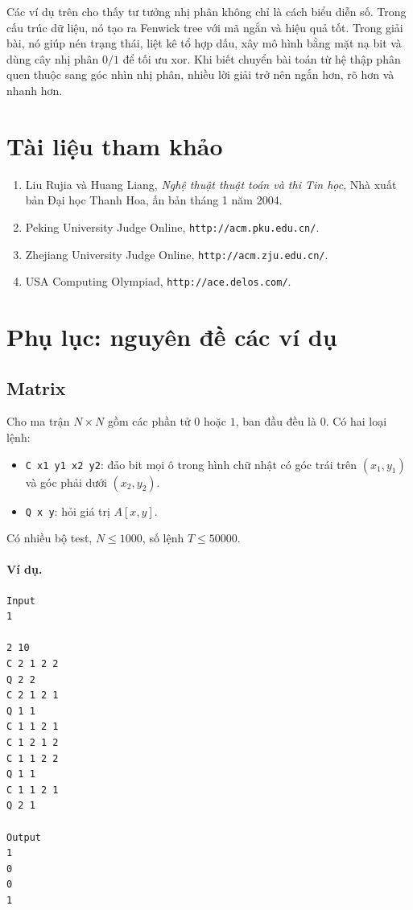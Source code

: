 \documentclass[11pt]{article}
\begin{document}
Các ví dụ trên cho thấy tư tưởng nhị phân không chỉ là cách biểu diễn số.
Trong cấu trúc dữ liệu, nó tạo ra Fenwick tree với mã ngắn và hiệu quả tốt.
Trong giải bài, nó giúp nén trạng thái, liệt kê tổ hợp dấu, xây mô hình bằng
mặt nạ bit và dùng cây nhị phân \(0/1\) để tối ưu xor. Khi biết chuyển bài
toán từ hệ thập phân quen thuộc sang góc nhìn nhị phân, nhiều lời giải trở
nên ngắn hơn, rõ hơn và nhanh hơn.

\section{Tài liệu tham khảo}

\begin{enumerate}
  \item Liu Rujia và Huang Liang, \textit{Nghệ thuật thuật toán và thi Tin
  học}, Nhà xuất bản Đại học Thanh Hoa, ấn bản tháng 1 năm 2004.
  \item Peking University Judge Online, \texttt{http://acm.pku.edu.cn/}.
  \item Zhejiang University Judge Online, \texttt{http://acm.zju.edu.cn/}.
  \item USA Computing Olympiad, \texttt{http://ace.delos.com/}.
\end{enumerate}

\section{Phụ lục: nguyên đề các ví dụ}

\subsection{Matrix}

Cho ma trận \(N\times N\) gồm các phần tử \(0\) hoặc \(1\), ban đầu đều là
\(0\). Có hai loại lệnh:
\begin{itemize}
  \item \texttt{C x1 y1 x2 y2}: đảo bit mọi ô trong hình chữ nhật có góc trái
  trên \((x_1,y_1)\) và góc phải dưới \((x_2,y_2)\).
  \item \texttt{Q x y}: hỏi giá trị \(A[x,y]\).
\end{itemize}
Có nhiều bộ test, \(N\le 1000\), số lệnh \(T\le 50000\).

\paragraph{Ví dụ.}
\begin{verbatim}
Input
1

2 10
C 2 1 2 2
Q 2 2
C 2 1 2 1
Q 1 1
C 1 1 2 1
C 1 2 1 2
C 1 1 2 2
Q 1 1
C 1 1 2 1
Q 2 1

Output
1
0
0
1
\end{verbatim}
\end{document}
